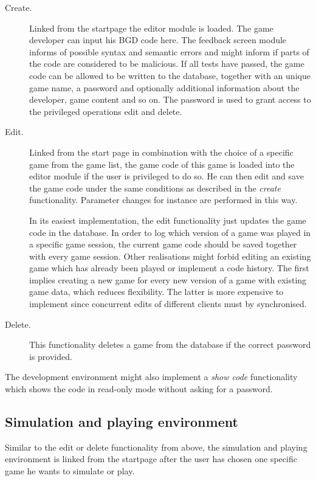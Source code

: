 \begin{description}
\item[Create.] Linked from the startpage the editor module is loaded. The game developer can input his BGD code here. The feedback screen module informs of possible syntax and semantic errors and might inform if parts of the code are considered to be malicious. If all tests have passed, the game code can be allowed to be written to the database, together with an unique game name, a password and optionally additional information about the developer, game content and so on. The password is used to grant access to the privileged operations edit and delete.
\item[Edit.] Linked from the start page in combination with the choice of a specific game from the game list, the game code of this game is loaded into the editor module if the user is privileged to do so. He can then edit and save the game code under the same conditions as described in the \textit{create} functionality. Parameter changes for instance are performed in this way.

In its easiest implementation, the edit functionality just updates the game code in the database. In order to log which version of a game was played in a specific game session, the current game code should be saved together with every game session. Other realisations might forbid editing an existing game which has already been played or implement a code history. The first implies creating a new game for every new version of a game with existing game data, which reduces flexibility. The latter is more expensive to implement since concurrent edits of different clients must by synchronised.
\item[Delete.] This functionality deletes a game from the database if the correct password is provided.
\end{description}

The development environment might also implement a \textit{show code} functionality which shows the code in read-only mode without asking for a password.

\subsection{Simulation and playing environment}
\label{subsec:bge:simplay}

Similar to the edit or delete functionality from above, the simulation and playing environment is linked from the startpage after the user has chosen one specific game he wants to simulate or play.

